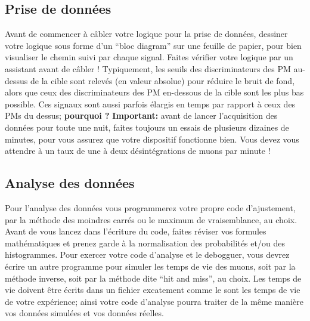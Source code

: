 \subsection{Prise de données}
Avant de commencer à câbler votre logique pour la prise de données, dessiner votre logique sous forme d'un ``bloc diagram'' sur une feuille de papier, pour
bien visualiser le chemin suivi par chaque signal. Faites vérifier votre logique
par un assistant avant de câbler !
Typiquement, les seuils des discriminateurs des PM au-dessus de la cible sont relevés (en valeur absolue) pour réduire le bruit de fond, alors que ceux des  
discriminateurs des PM en-dessous de la cible sont les plus bas possible. Ces 
signaux sont aussi parfois élargis en temps par rapport à ceux des PMs du dessus; \textbf{pourquoi ?}
\newline
 \textbf{Important:} avant de lancer l'acquisition des données pour toute une nuit, faites toujours un essais de plusieurs dizaines de minutes, pour vous assurez que
votre dispositif fonctionne bien. Vous devez vous attendre à un taux de une à 
deux désintégrations de muons par minute !

\subsection{Analyse des données}
Pour l'analyse des données vous programmerez votre propre code d'ajustement, 
par la méthode des moindres carrés ou le maximum de vraisemblance, au choix.
Avant de vous lancez dans l'écriture du code, faites réviser vos formules mathématiques et prenez garde à la normalisation des probabilités et/ou des histogrammes.
Pour exercer votre code d'analyse et le debogguer, vous devrez écrire un autre
programme pour simuler les temps de vie des muons, soit par la méthode inverse, soit par la méthode dite ``hit and miss'', au choix. Les temps de vie doivent être écrits dans un fichier excatement comme le sont les temps de vie de votre
expérience; ainsi votre code d'analyse pourra traiter de la même  manière vos données simulées et vos données réelles.

